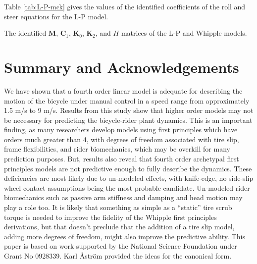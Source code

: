 \documentclass[a4paper]{article}
\begin{document}
Table \ref{tab:L-P-mck} gives the values of the identified coefficients of the
roll and steer equations for the L-P model.

\begin{table}
  \label{tab:L-P-mck}
  \centering
  \caption{The identified $\mathbf{M}$, $\mathbf{C}_1$, $\mathbf{K}_0$,
    $\mathbf{K}_2$, and $H$ matrices of the L-P and Whipple models.}
  
\end{table}

\section*{Summary and Acknowledgements}

We have shown that a fourth order linear model is adequate for describing the
motion of the bicycle under manual control in a speed range from approximately
1.5 m/s to 9 m/s. Results from this study show that higher order models may
not be necessary for predicting the bicycle-rider plant dynamics. This is an
important finding, as many researchers develop models using first principles
which have orders much greater than 4, with degrees of freedom associated with
tire slip, frame flexibilities, and rider biomechanics, which may be overkill
for many prediction purposes. But, results also reveal that fourth order
archetypal first principles models are not predictive enough to fully describe
the dynamics. These deficiencies are most likely due to un-modeled effects,
with knife-edge, no side-slip wheel contact assumptions being the most probable
candidate. Un-modeled rider biomechanics such as passive arm stiffness and
damping and head motion may play a role too. It is likely that something as
simple as a ``static'' tire scrub torque is needed to improve the fidelity of
the Whipple first principles derivations, but that doesn't preclude that the
addition of a tire slip model, adding more degrees of freedom, might also
improve the predictive ability.
This paper is based on work supported by the National Science Foundation under
Grant No 0928339. Karl {\AA}str{\"o}m provided the ideas for the canonical form.



\end{document}
